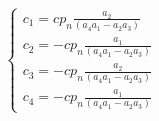 \documentclass[a4paper,14pt]{extarticle}
\numberwithin{equation}{section}
\begin{document}
\begin{equation*}
    \begin{cases}
        c_1 = c p_n \frac{a_2}{(a_4 a_1 - a_2 a_3)} \\
        c_2 = - c p_n \frac{a_1}{(a_4 a_1 - a_2 a_3)} \\
        c_3 = -c p_n \frac{a_2}{(a_4 a_1 - a_2 a_3)} \\
        c_4 = - c p_n \frac{a_1}{(a_4 a_1 - a_2 a_3)}
    \end{cases}
\end{equation*}
\end{document}
